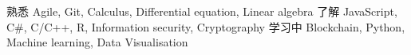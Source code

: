 
\begin{cvskills}
	\cvskill
		{熟悉}
		{Agile,\enskip 
		Git,\enskip 
		Calculus,\enskip
		Differential equation, \enskip
		Linear algebra}
	\cvskill
		{了解}
		{JavaScript,\enskip 
		C\#,\enskip 
		C/C++, \enskip
		R,\enskip
		Information security,\enskip
		Cryptography}
	\cvskill
		{学习中}
		{Blockchain,\enskip
		Python,\enskip 
		Machine learning, \enskip
		Data Visualisation}
\end{cvskills}

